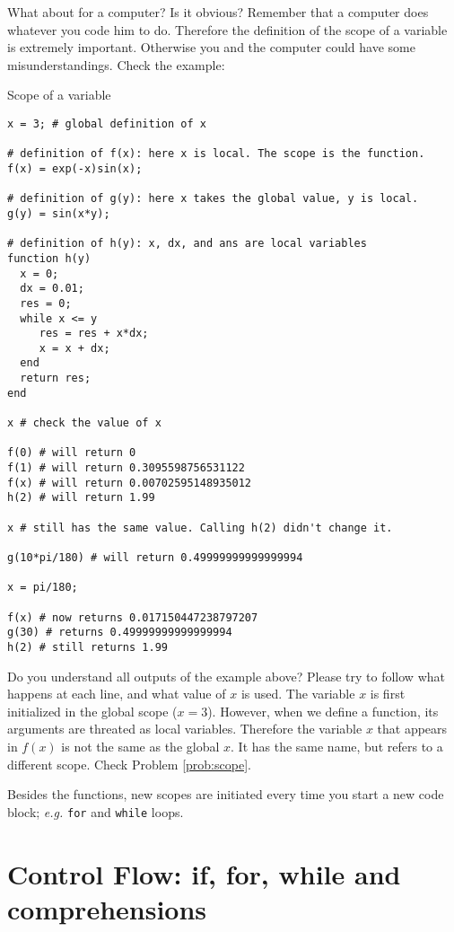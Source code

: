 What about for a computer? Is it obvious? Remember that a computer does whatever you code him to do. Therefore the definition of the scope of a variable is extremely important. Otherwise you and the computer could have some misunderstandings. Check the example:

\begin{example}{Scope of a variable}
\label{ex:scope}
\begin{verbatim}
x = 3; # global definition of x

# definition of f(x): here x is local. The scope is the function.
f(x) = exp(-x)sin(x);

# definition of g(y): here x takes the global value, y is local.
g(y) = sin(x*y);

# definition of h(y): x, dx, and ans are local variables
function h(y)
  x = 0;
  dx = 0.01;
  res = 0;
  while x <= y
     res = res + x*dx;
     x = x + dx;
  end
  return res;
end

x # check the value of x

f(0) # will return 0
f(1) # will return 0.3095598756531122
f(x) # will return 0.00702595148935012
h(2) # will return 1.99

x # still has the same value. Calling h(2) didn't change it.

g(10*pi/180) # will return 0.49999999999999994

x = pi/180;

f(x) # now returns 0.017150447238797207
g(30) # returns 0.49999999999999994
h(2) # still returns 1.99
\end{verbatim}
\end{example}

Do you understand all outputs of the example above? Please try to follow what happens at each line, and what value of $x$ is used. The variable $x$ is first initialized in the global scope ($x=3$). However, when we define a function, its arguments are threated as local variables. Therefore the variable $x$ that appears in $f(x)$ is not the same as the global $x$. It has the same name, but refers to a different scope. Check Problem \ref{prob:scope}.

Besides the functions, new scopes are initiated every time you start a new code block; \textit{e.g.} \texttt{for} and \texttt{while} loops.

\section{Control Flow: if, for, while and comprehensions}

